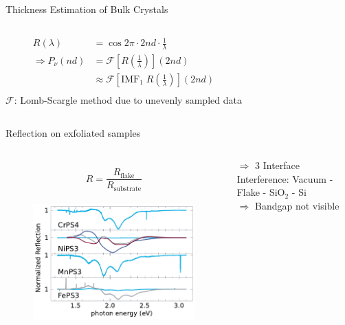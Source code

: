 \documentclass[
	10pt,
]{beamer}
\begin{document}
\begin{frame}{Thickness Estimation of Bulk Crystals}
\begin{columns}
		\begin{align*}
			R(\lambda) &= \cos 2 \pi \cdot 2 n d \cdot  \frac{1}{\lambda}\\
			\Rightarrow P_\nu(n d) &= \mathcal{F}\left[R\left(\frac{1}{\lambda}\right)\right]( 2 nd)\\
			&\approx  \mathcal{F}\left[\text{IMF}_1\; R\left(\frac{1}{\lambda}\right)\right]( 2 nd)\\
		\end{align*}
		$\mathcal{F}$: Lomb-Scargle method due to unevenly sampled data
	\end{columns}
\end{frame}

\begin{frame}{Reflection on exfoliated samples}
	\begin{columns}
		\begin{figure}
			\centering
			$$R = \frac{R_\text{flake}}{R_\text{substrate}}$$\\
			\includegraphics[width=\textwidth]{../figures/2024-04-10 normalized reflection spectra.pdf}
		\end{figure}
		{\color{seeblau}$\Rightarrow$} 3 Interface Interference: Vacuum - Flake - SiO$_2$ - Si\\
		{\color{seeblau}$\Rightarrow$} Bandgap not visible
		

\end{columns}
\end{frame}
\end{document}

